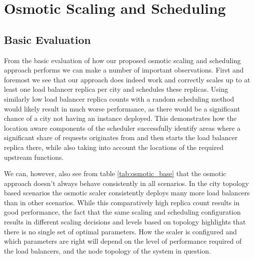 \section{Osmotic Scaling and Scheduling}

\subsection{Basic Evaluation}
From the basic evaluation of how our proposed osmotic scaling and scheduling approach performs we can make a number of important observations.
First and foremost we see that our approach does indeed work and correctly scales up to at least one load balancer replica per city and schedules these replicas.
Using similarly low load balancer replica counts with a random scheduling method would likely result in much worse performance, as there would be a significant chance of a city not having an instance deployed.
This demonstrates how the location aware components of the scheduler successfully identify areas where a significant share of requests originates from and then starts the load balancer replica there, while also taking into account the locations of the required upstream functions.

We can, however, also see from table \ref{tab:osmotic_base} that the osmotic approach doesn't always behave consistently in all scenarios.
In the city topology based scenarios the osmotic scaler consistently deploys many more load balancers than in other scenarios.
While this comparatively high replica count results in good performance, the fact that the same scaling and scheduling configuration results in different scaling decisions and levels based on topology highlights that there is no single set of optimal parameters.
How the scaler is configured and which parameters are right will depend on the level of performance required of the load balancers, and the node topology of the system in question.

